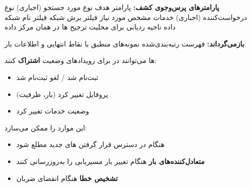 \textbf{پارامترهای پرس‌وجوی کشف:}\CNbr{}\lr{\textbar{}} پارامتر \lr{\textbar{}} هدف \lr{\textbar{}}\CNbr{}\CNbr{} نوع  مورد جستجو (اجباری) \lr{\textbar{}}\CNbr{} نوع  درخواست‌کننده (اجباری) \lr{\textbar{}}\CNbr{} خدمات مشخص مورد نیاز \lr{\textbar{}}\CNbr{} فیلتر برش شبکه \lr{\textbar{}}\CNbr{} فیلتر نام شبکه داده \lr{\textbar{}}\CNbr{} ناحیه ردیابی برای محلیت \lr{\textbar{}}\CNbr{} ترجیح ها در همان مرکز داده \lr{\textbar{}}

\textbf{ بازمی‌گرداند:} فهرست رتبه‌بندی‌شده نمونه‌های  منطبق با نقاط انتهایی و اطلاعات بار.


ها می‌توانند در  برای رویدادهای وضعیت \textbf{اشتراک} کنند:

\begin{itemize}
\tightlist
\item
   ثبت‌نام شد /\allowbreak{} لغو ثبت‌نام شد
\item
  پروفایل  تغییر کرد (بار، ظرفیت)
\item
  وضعیت خدمات  تغییر کرد
\end{itemize}

این موارد را ممکن می‌سازد:

\begin{itemize}
\tightlist
\item
   هنگام در دسترس قرار گرفتن های جدید مطلع شود
\item
  \textbf{متعادل‌کننده‌های بار} هنگام تغییر بار  مسیریابی را به‌روزرسانی کنند
\item
  \textbf{تشخیص خطا} هنگام انقضای ضربان 
\end{itemize}




